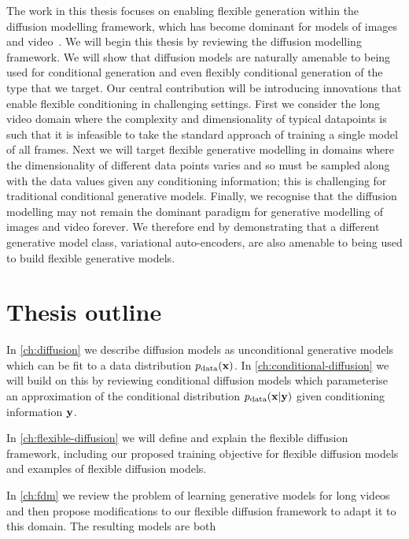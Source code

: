 The work in this thesis focuses on enabling flexible generation within the diffusion modelling framework, which has become dominant for models of images and video~\citep{sohl2015deep,ho2020denoising,dhariwal2021diffusion,rombach2022high,ho2022imagen,peebles2022scalable,brooks2024video}. We will begin this thesis by reviewing the diffusion modelling framework. We will show that diffusion models are naturally amenable to being used for conditional generation and even flexibly conditional generation of the type that we target. Our central contribution will be introducing innovations that enable flexible conditioning in challenging settings. First we consider the long video domain where the complexity and dimensionality of typical datapoints is such that it is infeasible to take the standard approach of training a single model of all frames. Next we will target flexible generative modelling in domains where the dimensionality of different data points varies and so must be sampled along with the data values given any conditioning information; this is challenging for traditional conditional generative models. Finally, we recognise that the diffusion modelling may not remain the dominant paradigm for generative modelling of images and video forever. We therefore end by demonstrating that a different generative model class, variational auto-encoders, are also amenable to being used to build flexible generative models.

\section*{Thesis outline}
In \cref{ch:diffusion} we describe diffusion models as unconditional generative models which can be fit to a data distribution $p_{\rm{data}}({\mathbf{x}})$. In \cref{ch:conditional-diffusion} we will build on this by reviewing conditional diffusion models which parameterise an approximation of the conditional distribution $p_{\rm{data}}({\mathbf{x}}|{\mathbf{y}})$ given conditioning information ${\mathbf{y}}$.

In \cref{ch:flexible-diffusion} we will define and explain the flexible diffusion framework, including our proposed training objective for flexible diffusion models and examples of flexible diffusion models.

In \cref{ch:fdm} we review the problem of learning generative models for long videos and then propose modifications to our flexible diffusion framework to adapt it to this domain. The resulting models are both 



